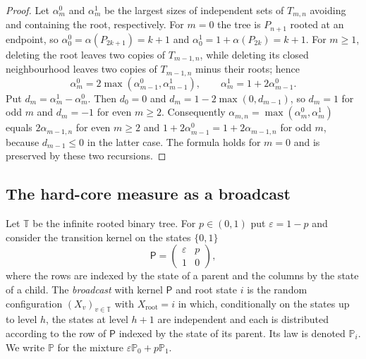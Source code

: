 \documentclass{amsart}
\theoremstyle{definition}
\theoremstyle{remark}
\numberwithin{equation}{section}
\newcommand{\eps}{\varepsilon}
\newcommand{\Prob}{\mathbb{P}}
\newcommand{\Tb}{\mathbb{T}}
\begin{document}
\begin{proof}
Let $\alpha^0_m$ and $\alpha^1_m$ be the largest sizes of independent sets of $T_{m,n}$ avoiding and containing the root, respectively. For $m=0$ the tree is $P_{n+1}$ rooted at an endpoint, so $\alpha^0_0=\alpha(P_{2k+1})=k+1$ and $\alpha^1_0=1+\alpha(P_{2k})=k+1$. For $m\ge1$, deleting the root leaves two copies of $T_{m-1,n}$, while deleting its closed neighbourhood leaves two copies of $T_{m-1,n}$ minus their roots; hence
\[
\alpha^0_m=2\max(\alpha^0_{m-1},\alpha^1_{m-1}),\qquad \alpha^1_m=1+2\alpha^0_{m-1}.
\]
Put $d_m=\alpha^1_m-\alpha^0_m$. Then $d_0=0$ and $d_m=1-2\max(0,d_{m-1})$, so $d_m=1$ for odd $m$ and $d_m=-1$ for even $m\ge2$. Consequently $\alpha_{m,n}=\max(\alpha^0_m,\alpha^1_m)$ equals $2\alpha_{m-1,n}$ for even $m\ge2$ and $1+2\alpha^0_{m-1}=1+2\alpha_{m-1,n}$ for odd $m$, because $d_{m-1}\le0$ in the latter case. The formula holds for $m=0$ and is preserved by these two recursions.
\end{proof}

\subsection{The hard-core measure as a broadcast}

Let $\Tb$ be the infinite rooted binary tree. For $p\in(0,1)$ put $\eps=1-p$ and consider the transition kernel on the states $\{0,1\}$
\begin{equation}\label{eq:kernel}
\mathsf P=\begin{pmatrix}\eps & p\\ 1 & 0\end{pmatrix},
\end{equation}
where the rows are indexed by the state of a parent and the columns by the state of a child. The \emph{broadcast} with kernel $\mathsf P$ and root state $i$ is the random configuration $(X_v)_{v\in\Tb}$ with $X_{\mathrm{root}}=i$ in which, conditionally on the states up to level $h$, the states at level $h+1$ are independent and each is distributed according to the row of $\mathsf P$ indexed by the state of its parent. Its law is denoted $\Prob_i$. We write $\Prob$ for the mixture $\eps\Prob_0+p\Prob_1$.
\end{document}
